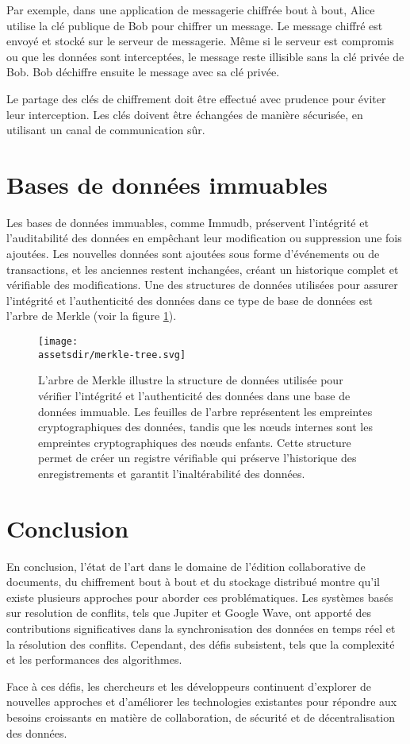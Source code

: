 Par exemple, dans une application de messagerie chiffrée bout à bout, Alice utilise la clé publique de Bob pour chiffrer un message. Le message chiffré est envoyé et stocké sur le serveur de messagerie. Même si le serveur est compromis ou que les données sont interceptées, le message reste illisible sans la clé privée de Bob. Bob déchiffre ensuite le message avec sa clé privée.

Le partage des clés de chiffrement doit être effectué avec prudence pour éviter leur interception. Les clés doivent être échangées de manière sécurisée, en utilisant un canal de communication sûr.

\section{Bases de données immuables}
Les bases de données immuables, comme Immudb\cite{incImmuDB2023}, préservent l'intégrité et l'auditabilité des données en empêchant leur modification ou suppression une fois ajoutées. Les nouvelles données sont ajoutées sous forme d'événements ou de transactions, et les anciennes restent inchangées, créant un historique complet et vérifiable des modifications. Une des structures de données utilisées pour assurer l'intégrité et l'authenticité des données dans ce type de base de données est l'arbre de Merkle (voir la figure \ref{merkle}).

\begin{figure}[!htb]
    \begin{center}
        \texttt{[image: \\assetsdir/merkle-tree.svg]}
    \end{center}
    \caption[Arbre de Merkle]{\label{merkle} L'arbre de Merkle illustre la structure de données utilisée pour vérifier l'intégrité et l'authenticité des données dans une base de données immuable. Les feuilles de l'arbre représentent les empreintes cryptographiques des données, tandis que les n\oe uds internes sont les empreintes cryptographiques des n\oe uds enfants. Cette structure permet de créer un registre vérifiable qui préserve l'historique des enregistrements et garantit l'inaltérabilité des données.}
\end{figure}

\section{Conclusion}
En conclusion, l'état de l'art dans le domaine de l'édition collaborative de documents, du chiffrement bout à bout et du stockage distribué montre qu'il existe plusieurs approches pour aborder ces problématiques. Les systèmes basés sur resolution de conflits, tels que Jupiter et Google Wave, ont apporté des contributions significatives dans la synchronisation des données en temps réel et la résolution des conflits. Cependant, des défis subsistent, tels que la complexité et les performances des algorithmes.

Face à ces défis, les chercheurs et les développeurs continuent d'explorer de nouvelles approches et d'améliorer les technologies existantes pour répondre aux besoins croissants en matière de collaboration, de sécurité et de décentralisation des données.